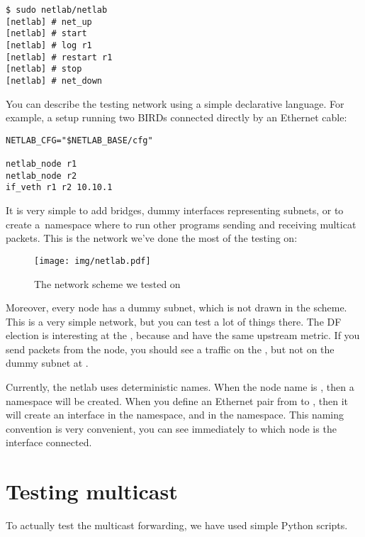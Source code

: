\begin{lstlisting}
$ sudo netlab/netlab
[netlab] # net_up
[netlab] # start
[netlab] # log r1
[netlab] # restart r1
[netlab] # stop
[netlab] # net_down
\end{lstlisting}

\noindent You can describe the testing network using a simple declarative language. For
example, a setup running two BIRDs connected directly by an Ethernet cable:

\begin{lstlisting}
NETLAB_CFG="$NETLAB_BASE/cfg"

netlab_node r1
netlab_node r2
if_veth r1 r2 10.10.1
\end{lstlisting}

\noindent It is very simple to add bridges, dummy interfaces representing subnets, or to
create a~namespace where to run other programs sending and receiving multicat
packets. This is the network we've done the most of the testing on:

\begin{figure}[htp]
\centering
\texttt{[image: img/netlab.pdf]}
\caption{The network scheme we tested on}
\label{netlab}
\end{figure}

Moreover, every node has a dummy subnet, which is not drawn in the scheme.
This is a very simple network, but you can test a lot of things there. The DF
election is interesting at the , because  and 
have the same upstream metric. If you send packets from the  node, you should see
a traffic on the , but not on the dummy subnet at .

Currently, the netlab uses deterministic names. When the node name is
, then a namespace  will be created. When you define
an Ethernet pair from  to , then it will create an interface
 in the  namespace, and  in the
 namespace. This naming convention is very convenient, you can
see immediately to which node is the interface connected.

\section{Testing multicast}
To actually test the multicast forwarding, we have used simple Python scripts.

